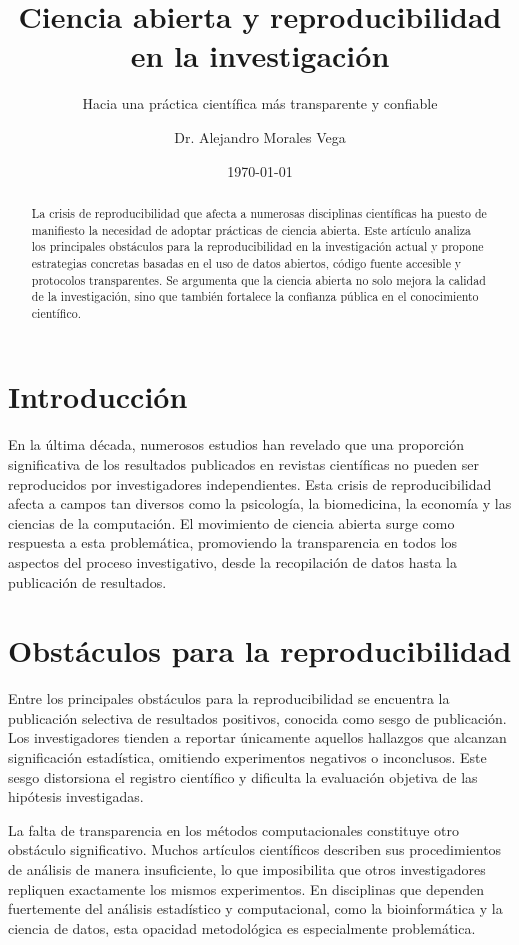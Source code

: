 \documentclass[
    language=spanish,
    doctype=article,
]{../../omnilatex}
\title{Ciencia abierta y reproducibilidad en la investigación}
\subtitle{Hacia una práctica científica más transparente y confiable}
\author{Dr. Alejandro Morales Vega}
\date{\today}
\begin{document}
\maketitle

\begin{abstract}
La crisis de reproducibilidad que afecta a numerosas disciplinas científicas ha puesto de manifiesto la necesidad de adoptar prácticas de ciencia abierta. Este artículo analiza los principales obstáculos para la reproducibilidad en la investigación actual y propone estrategias concretas basadas en el uso de datos abiertos, código fuente accesible y protocolos transparentes. Se argumenta que la ciencia abierta no solo mejora la calidad de la investigación, sino que también fortalece la confianza pública en el conocimiento científico.
\end{abstract}

\section{Introducción}
En la última década, numerosos estudios han revelado que una proporción significativa de los resultados publicados en revistas científicas no pueden ser reproducidos por investigadores independientes. Esta crisis de reproducibilidad afecta a campos tan diversos como la psicología, la biomedicina, la economía y las ciencias de la computación. El movimiento de ciencia abierta surge como respuesta a esta problemática, promoviendo la transparencia en todos los aspectos del proceso investigativo, desde la recopilación de datos hasta la publicación de resultados.

\section{Obstáculos para la reproducibilidad}
Entre los principales obstáculos para la reproducibilidad se encuentra la publicación selectiva de resultados positivos, conocida como sesgo de publicación. Los investigadores tienden a reportar únicamente aquellos hallazgos que alcanzan significación estadística, omitiendo experimentos negativos o inconclusos. Este sesgo distorsiona el registro científico y dificulta la evaluación objetiva de las hipótesis investigadas.

La falta de transparencia en los métodos computacionales constituye otro obstáculo significativo. Muchos artículos científicos describen sus procedimientos de análisis de manera insuficiente, lo que imposibilita que otros investigadores repliquen exactamente los mismos experimentos. En disciplinas que dependen fuertemente del análisis estadístico y computacional, como la bioinformática y la ciencia de datos, esta opacidad metodológica es especialmente problemática.
\end{document}

